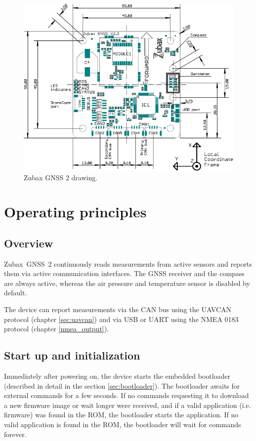 \documentclass{zubaxdoc}
\begin{document}
\begin{figure}[!hbt]
    \center
	\includegraphics[width=1\textwidth]{GNSS2_drawing}
	\caption{Zubax GNSS 2 drawing.\label{drawing}}
\end{figure}

\chapter{Operating principles}

\section{Overview}

Zubax~GNSS~2 continuously reads measurements from active sensors and reports them via
active communication interfaces.
The GNSS receiver and the compass are always active,
whereas the air pressure and temperature sensor is disabled by default.

The device can report measurements via the CAN bus using the UAVCAN protocol (chapter \ref{sec:uavcan}) and
via USB or UART using the NMEA 0183 protocol (chapter \ref{nmea_output}).

\section{Start up and initialization}

Immediately after powering on, the device starts the embedded bootloader (described in detail in the section
\ref{sec:bootloader}).
The bootloader awaits for external commands for a few seconds.
If no commands requesting it to download a new firmware image or wait longer were received,
and if a valid application (i.e. firmware) was found in the ROM,
the bootloader starts the application.
If no valid application is found in the ROM, the bootloader will wait for commands forever.
\end{document}
